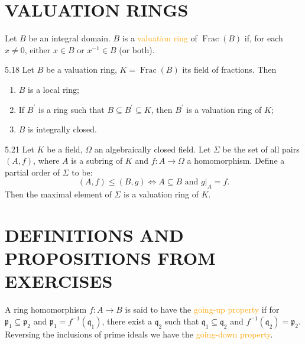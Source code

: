 \section*{VALUATION RINGS}

\begin{definition}
	Let $B$ be an integral domain. $B$ is a \textcolor{orange}{valuation ring} of $\operatorname{Frac}(B)$ if, for each $x\neq0$, either $x\in B$ or $x^{-1}\in B$ (or both).
\end{definition}

\begin{proposition}{5.18}
	Let $B$ be a valuation ring, $K=\operatorname{Frac}(B)$ its field of fractions. Then
	\begin{enumerate}[label=\textup{(\roman*)},ref=\thepropositiontemp(\roman*)]
		\item\label{5.18.1} $B$ is a local ring;
		\item\label{5.18.2} If $B^\prime$ is a ring such that $B\subseteq B^\prime\subseteq K$, then $B^\prime$ is a valuation ring of $K$;
		\item\label{5.18.3} $B$ is integrally closed.
	\end{enumerate}
\end{proposition}

\begin{theorem}{5.21}
	Let $K$ be a field, $\Omega$ an algebraically closed field. Let $\Sigma$ be the set of all pairs $(A,f)$, where $A$ is a subring of $K$ and $f:A\rightarrow\Omega$ a homomorphism. Define a partial order of $\Sigma$ to be:
	\begin{equation*}
		(A,f)\leqslant(B,g)\Leftrightarrow A\subseteq B \text{ and } g|_A=f.
	\end{equation*}
	Then the maximal element of $\Sigma$ is a valuation ring of $K$.
\end{theorem}

\section*{DEFINITIONS AND PROPOSITIONS FROM EXERCISES}

\begin{definition}
	A ring homomorphism $f: A\rightarrow B$ is said to have the \textcolor{orange}{going-up property} if for $\mathfrak{p}_1\subseteq\mathfrak{p}_2$ and $\mathfrak{p}_1=f^{-1}(\mathfrak{q}_1)$, there exist a $\mathfrak{q}_2$ such that $\mathfrak{q}_1\subseteq\mathfrak{q}_2$ and $f^{-1}(\mathfrak{q}_2)=\mathfrak{p}_2$. Reversing the inclusions of prime ideals we have the \textcolor{orange}{going-down property}.
\end{definition}


